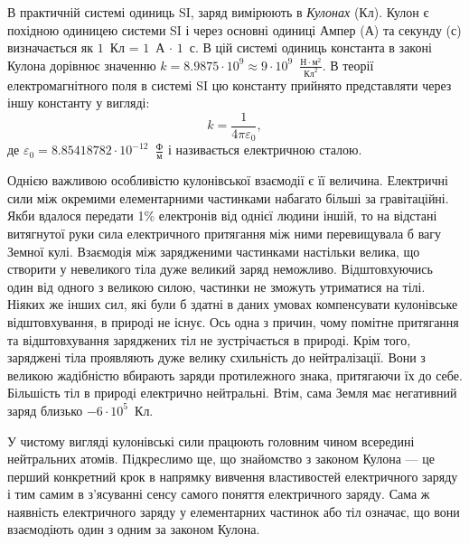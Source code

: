 В практичній системі одиниць SI, заряд вимірюють в \emph{Кулонах} (Кл). Кулон є похідною одиницею системи SI і через основні одиниці Ампер (А) та секунду (с) визначається як $1$~Кл = $1$~А $\cdot$ $1$~с. В цій системі одиниць константа в законі Кулона дорівнює значенню $k = 8.9875 \cdot 10^{9} \approx 9\cdot 10^{9}$~$\frac{\text{Н}\cdot\text{м}^2}{\text{Кл}^2}$. В теорії електромагнітного поля в системі SI цю константу прийнято представляти через іншу константу у вигляді:
\begin{equation}\label{}
    k = \frac{1}{4\pi\varepsilon_0},
\end{equation}
де $\varepsilon_0 = 8.85418782 \cdot 10^{-12}$~$\frac{\text{Ф}}{\text{м}}$ і називається електричною сталою.



Однією важливою особливістю кулонівської взаємодії є її величина. Елек\-тричні сили між окремими елементарними частинками набагато більші за гравітаційні. Якби вдалося передати 1\% електронів
від однієї людини іншій, то на відстані витягнутої руки сила електричного притягання між ними перевищувала б вагу Земної кулі.  Взаємодія між зарядженими частинками настільки велика, що створити у невеликого тіла дуже великий заряд неможливо. Відштовхуючись один від одного з великою силою, частинки не зможуть утриматися на тілі. Ніяких же інших сил, які були б здатні в даних умовах компенсувати кулонівське відштовхування, в природі не існує. Ось одна з причин, чому помітне притягання та відштовхування заряджених тіл не зустрічається в природі. Крім того, заряджені тіла проявляють дуже велику схильність до нейтралізації. Вони з великою жадібністю вбирають заряди протилежного знака, притягаючи їх до себе. Більшість тіл в природі електрично нейтральні. Втім, сама Земля має негативний заряд близько $ - 6\cdot 10^5$~Кл.

У чистому вигляді кулонівські сили працюють головним чином всередині нейтральних атомів.  Підкреслимо ще, що знайомство з законом Кулона --- це перший конкретний крок в напрямку вивчення властивостей електричного заряду і тим самим в з'ясуванні сенсу самого поняття електричного заряду. Сама ж наявність електричного заряду у елементарних частинок або тіл означає, що вони взаємодіють один з одним за законом Кулона.

